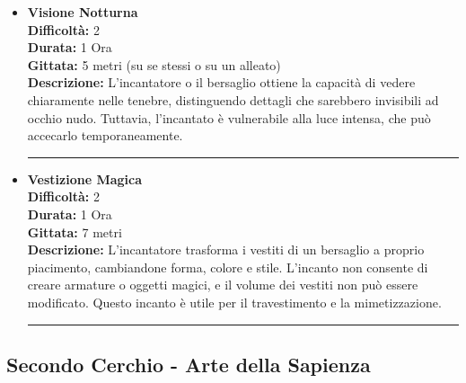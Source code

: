 \documentclass[./magie.tex]{subfiles}
\begin{document}
\begin{itemize}
\item \textbf{Visione Notturna} \\
\textbf{Difficoltà:} 2 \\
\textbf{Durata:} 1 Ora \\
\textbf{Gittata:} 5 metri (su se stessi o su un alleato) \\
\textbf{Descrizione:} L'incantatore o il bersaglio ottiene la capacità di vedere chiaramente nelle tenebre, distinguendo dettagli che sarebbero invisibili ad occhio nudo. Tuttavia, l'incantato è vulnerabile alla luce intensa, che può accecarlo temporaneamente.

\vspace{0.2cm}
\noindent
\begin{center}
\rule{\textwidth}{0.4pt} 
\end{center}
\vspace{0.2cm}

\item \textbf{Vestizione Magica} \\
\textbf{Difficoltà:} 2 \\
\textbf{Durata:} 1 Ora \\
\textbf{Gittata:} 7 metri \\
\textbf{Descrizione:} L'incantatore trasforma i vestiti di un bersaglio a proprio piacimento, cambiandone forma, colore e stile. L'incanto non consente di creare armature o oggetti magici, e il volume dei vestiti non può essere modificato. Questo incanto è utile per il travestimento e la mimetizzazione.

\vspace{0.2cm}
\noindent
\begin{center}
\rule{\textwidth}{0.4pt} 
\end{center}
\vspace{0.2cm}

\end{itemize}
\clearpage
 \subsection*{Secondo Cerchio - Arte della Sapienza}
\end{document}
